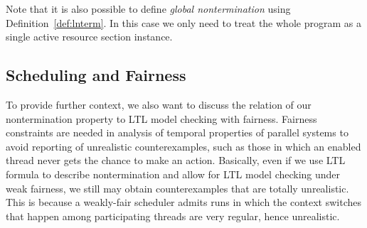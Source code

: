 % 


Note that it is also possible to define \emph{global nontermination} using
Definition~\ref{def:lnterm}. In this case we only need to treat the whole
program as a single active resource section instance.


\subsection{Scheduling and Fairness} \label{sec:fairness}

To provide further context, we also want to discuss the relation of our
nontermination property to LTL model checking with fairness.  Fairness
constraints \cite[Chapter 3.5]{PoMC} are needed in analysis of temporal
properties of parallel systems to avoid reporting of unrealistic
counterexamples, such as those in which an enabled thread never gets the chance
to make an action. Basically, even if we use LTL formula to
describe nontermination and allow for LTL model checking under weak fairness, we
still may obtain counterexamples that are totally unrealistic. This is because a
weakly-fair scheduler\footnotemark{} admits runs in which the context switches that happen
among participating threads are very regular, hence unrealistic.


